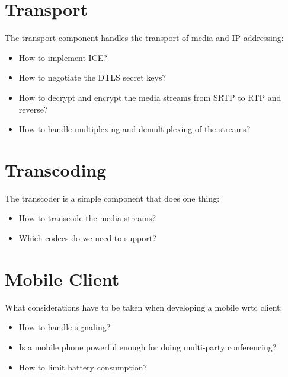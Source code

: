 \section{Transport}
The transport component handles the transport of media and IP addressing:
\begin{itemize}
\item{How to implement ICE?}
\item{How to negotiate the DTLS secret keys?}
\item{How to decrypt and encrypt the media streams from SRTP to RTP and reverse?}
\item{How to handle multiplexing and demultiplexing of the streams?}
\end{itemize}

\newpage
\section{Transcoding}
The transcoder is a simple component that does one thing:
\begin{itemize}
\item{How to transcode the media streams?}
\item{Which codecs do we need to support?}
\end{itemize}

\section{Mobile Client}
What considerations have to be taken when developing a mobile \gls{wrtc} client:
\begin{itemize}
\item{How to handle signaling?}
\item{Is a mobile phone powerful enough for doing multi-party conferencing?}
\item{How to limit battery consumption?}
\end{itemize}